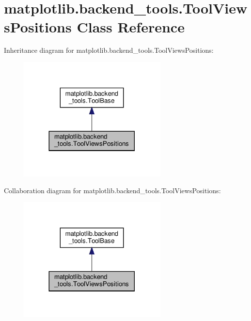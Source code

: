\hypertarget{classmatplotlib_1_1backend__tools_1_1ToolViewsPositions}{}\section{matplotlib.\+backend\+\_\+tools.\+Tool\+Views\+Positions Class Reference}
\label{classmatplotlib_1_1backend__tools_1_1ToolViewsPositions}


Inheritance diagram for matplotlib.\+backend\+\_\+tools.\+Tool\+Views\+Positions\+:
\nopagebreak
\begin{figure}[H]
\begin{center}
\leavevmode
\includegraphics[width=212pt]{classmatplotlib_1_1backend__tools_1_1ToolViewsPositions__inherit__graph}
\end{center}
\end{figure}


Collaboration diagram for matplotlib.\+backend\+\_\+tools.\+Tool\+Views\+Positions\+:
\nopagebreak
\begin{figure}[H]
\begin{center}
\leavevmode
\includegraphics[width=212pt]{classmatplotlib_1_1backend__tools_1_1ToolViewsPositions__coll__graph}
\end{center}
\end{figure}
